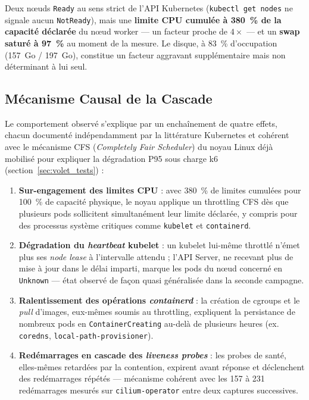 Deux nœuds \texttt{Ready} au sens strict de l'API Kubernetes (\texttt{kubectl get nodes} ne signale aucun \texttt{NotReady}), mais une \textbf{limite CPU cumulée à 380~\% de la capacité déclarée} du nœud worker — un facteur proche de $4\times$ — et un \textbf{swap saturé à 97~\%} au moment de la mesure. Le disque, à 83~\% d'occupation (157~Go / 197~Go), constitue un facteur aggravant supplémentaire mais non déterminant à lui seul.

\subsection{Mécanisme Causal de la Cascade}

Le comportement observé s'explique par un enchaînement de quatre effets, chacun documenté indépendamment par la littérature Kubernetes et cohérent avec le mécanisme CFS (\textit{Completely Fair Scheduler}) du noyau Linux déjà mobilisé pour expliquer la dégradation P95 sous charge k6 (section~\ref{sec:volet_tests}) :

\begin{enumerate}
    \item \textbf{Sur-engagement des limites CPU} : avec 380~\% de limites cumulées pour 100~\% de capacité physique, le noyau applique un throttling CFS dès que plusieurs pods sollicitent simultanément leur limite déclarée, y compris pour des processus système critiques comme \texttt{kubelet} et \texttt{containerd}.
    \item \textbf{Dégradation du \textit{heartbeat} kubelet} : un kubelet lui-même throttlé n'émet plus ses \textit{node lease} à l'intervalle attendu ; l'API Server, ne recevant plus de mise à jour dans le délai imparti, marque les pods du nœud concerné en \texttt{Unknown} — état observé de façon quasi généralisée dans la seconde campagne.
    \item \textbf{Ralentissement des opérations \textit{containerd}} : la création de cgroups et le \textit{pull} d'images, eux-mêmes soumis au throttling, expliquent la persistance de nombreux pods en \texttt{ContainerCreating} au-delà de plusieurs heures (ex. \texttt{coredns}, \texttt{local-path-provisioner}).
    \item \textbf{Redémarrages en cascade des \textit{liveness probes}} : les probes de santé, elles-mêmes retardées par la contention, expirent avant réponse et déclenchent des redémarrages répétés — mécanisme cohérent avec les 157 à 231 redémarrages mesurés sur \texttt{cilium-operator} entre deux captures successives.
\end{enumerate}

